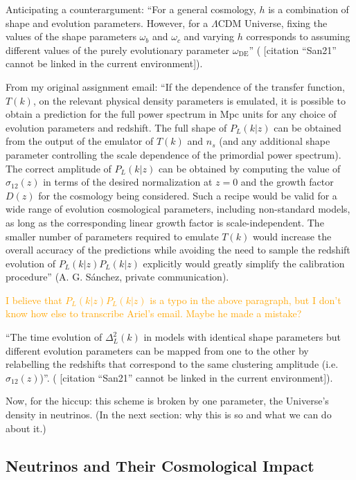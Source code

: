 \documentclass[11pt]{article}
\newcommand{\cbib}[1]
{\IfFileExists{biblatex.sty}
{\cite{#1}}
{[citation ``#1'' cannot be linked in the current environment]}}
\begin{document}
Anticipating a counterargument: ``For a general cosmology, $h$ is a combination
of shape and evolution parameters. However, for a $\Lambda$CDM Universe, fixing
the values of the shape parameters $\omega_b$ and $\omega_c$ and varying $h$
corresponds to assuming different values of the purely evolutionary parameter
$\omega_\text{DE}$'' (\cbib{San21}).

From my original assignment email:
``If the dependence of the transfer function, $T(k)$, on the relevant physical
density parameters is emulated, it is possible to obtain a prediction for the
full power spectrum in Mpc units for any choice of evolution parameters and
redshift. The full shape of $P_L(k|z)$ can be obtained from the output of the
emulator of $T(k)$ and $n_s$ (and any additional shape parameter controlling
the scale dependence of the primordial power spectrum). The correct amplitude
of $P_L(k|z)$ can be obtained by computing the value of $\sigma_{12}(z)$ in
terms of the desired normalization at $z=0$ and the growth factor $D(z)$ for
the cosmology being considered. Such a recipe would be valid for a wide range
of evolution cosmological parameters, including non-standard models, as long as
the corresponding linear growth factor is scale-independent. The smaller number
of parameters required to emulate $T(k)$ would increase the overall accuracy of
the predictions while avoiding the need to sample the redshift evolution of
$P_L(k|z) P_L(k|z)$ explicitly would greatly simplify the calibration
procedure'' (A. G. S\'{a}nchez, private communication).

\textcolor{orange}{I believe that $P_L(k|z) P_L(k|z)$ is a typo in the above
paragraph, but I don't know how else to transcribe Ariel's email. Maybe he
made a mistake?}

``The time evolution of $\Delta_L^2(k)$ in models with identical shape
parameters
but different evolution parameters can be mapped from one to the other by
relabelling the redshifts that correspond to the same clustering amplitude
(i.e. $\sigma_{12}(z)$)''.
(\cbib{San21}).

Now, for the hiccup: this scheme is broken by one parameter, the Universe's
density in neutrinos. (In the next section: why this is so and what we can do
about it.)


\begin{centering}
\section{Neutrinos and Their Cosmological Impact}
\end{centering}
\end{document}
